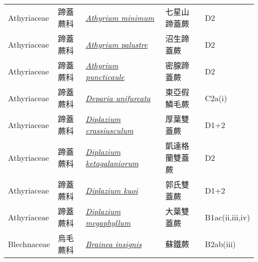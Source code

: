 {\begin{longtable}{L{2.5cm}L{2cm}L{5cm}L{2.5cm}L{3cm}}
    Athyriaceae & 蹄蓋蕨科 & \href{http://www.theplantlist.org/tpl1.1/search?q=Athyrium+minimum}{\textit{Athyrium minimum} } & 七星山蹄蓋蕨 & D2    \\
    Athyriaceae & 蹄蓋蕨科 & \href{http://www.theplantlist.org/tpl1.1/search?q=Athyrium+palustre}{\textit{Athyrium palustre} } & 沼生蹄蓋蕨 & D2    \\
    Athyriaceae & 蹄蓋蕨科 & \href{http://www.theplantlist.org/tpl1.1/search?q=Athyrium+puncticaule}{\textit{Athyrium puncticaule} } & 密腺蹄蓋蕨 & D2    \\
    Athyriaceae & 蹄蓋蕨科 & \href{http://www.theplantlist.org/tpl1.1/search?q=Deparia+unifurcata}{\textit{Deparia unifurcata} } & 東亞假鱗毛蕨 & C2a(i)    \\
    Athyriaceae & 蹄蓋蕨科 & \href{http://www.theplantlist.org/tpl1.1/search?q=Diplazium+crassiusculum}{\textit{Diplazium crassiusculum} } & 厚葉雙蓋蕨 & D1+2    \\
    Athyriaceae & 蹄蓋蕨科 & \href{http://www.theplantlist.org/tpl1.1/search?q=Diplazium+ketagalaniorum}{\textit{Diplazium ketagalaniorum} } & 凱達格蘭雙蓋蕨 & D2    \\
    Athyriaceae & 蹄蓋蕨科 & \href{http://www.theplantlist.org/tpl1.1/search?q=Diplazium+kuoi}{\textit{Diplazium kuoi} } & 郭氏雙蓋蕨 & D1+2    \\
    Athyriaceae & 蹄蓋蕨科 & \href{http://www.theplantlist.org/tpl1.1/search?q=Diplazium+megaphyllum}{\textit{Diplazium megaphyllum} } & 大葉雙蓋蕨 & B1ac(ii,iii,iv)    \\
    Blechnaceae & 烏毛蕨科 & \href{http://www.theplantlist.org/tpl1.1/search?q=Brainea+insignis}{\textit{Brainea insignis} } & 蘇鐵蕨 & B2ab(iii)    \\

\end{longtable}}
